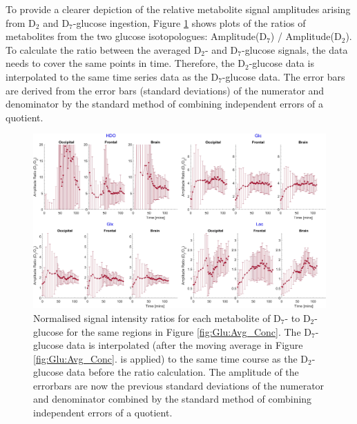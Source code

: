 \documentclass[class=article, crop=false]{standalone}
\begin{document}
To provide a clearer depiction of the relative metabolite signal amplitudes arising from D$_2$ and D$_7$-glucose ingestion, Figure \ref{fig:Glu:D7_D2} shows plots of the ratios of metabolites from the two glucose isotopologues: Amplitude(D$_7$) / Amplitude(D$_2$). To calculate the ratio between the averaged D$_2$- and D$_7$-glucose signals, the data needs to cover the same points in time. Therefore, the D$_2$-glucose data is interpolated to the same time series data as the D$_7$-glucose data. The error bars are derived from the error bars (standard deviations) of the numerator and denominator by the standard method of combining independent errors of a quotient. 

\begin{figure}
    \centering
    \includegraphics[width = 1\textwidth]{Figures/Glucose/D7_D2.png}
    \caption{Normalised signal intensity ratios for each metabolite of D$_7$- to D$_2$-glucose for the same regions in Figure \ref{fig:Glu:Avg_Conc}. The D$_7$-glucose data is interpolated (after the moving average in Figure \ref{fig:Glu:Avg_Conc}. is applied) to the same time course as the D$_2$-glucose data before the ratio calculation. The amplitude of the errorbars are now the previous standard deviations of the numerator and denominator combined by the standard method of combining independent errors of a quotient.}
    \label{fig:Glu:D7_D2}
\end{figure}
\end{document}
